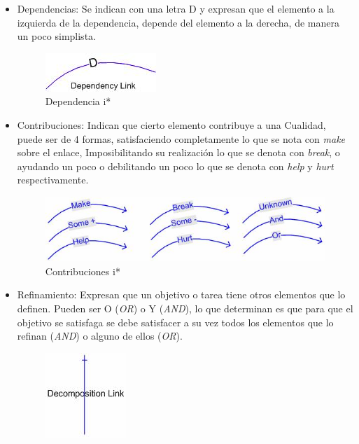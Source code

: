 \begin{itemize}
        \begin{itemize}
            \item Dependencias: Se indican con una letra D y expresan que el elemento a la izquierda de la dependencia, depende del elemento a la derecha, de manera un poco simplista.
            \begin{figure}[h!]
                \centering
                \includegraphics[scale=0.6]{media/imagenes/i_star/sintaxis/dependencylink.jpg}
                \caption{Dependencia \gls{i*}}
            \end{figure}
            \item Contribuciones: Indican que cierto elemento contribuye a una Cualidad, puede ser de 4 formas, satisfaciendo completamente lo que se nota con \textit{make} sobre el enlace, Imposibilitando su realización lo que se denota con \textit{break}, o ayudando un poco o debilitando un poco lo que se denota con \textit{help} y \textit{hurt} respectivamente.
            \begin{figure}[h!]
                \centering
                \includegraphics[scale=0.6]{media/imagenes/i_star/sintaxis/contribuitonlinks.jpg}
                \caption{Contribuciones \gls{i*}}
            \end{figure}
            \item Refinamiento: Expresan que un objetivo o tarea tiene otros elementos que lo definen. Pueden ser O (\textit{OR}) o Y (\textit{AND}), lo que determinan es que para que el objetivo se satisfaga se debe satisfacer a su vez todos los elementos que lo refinan (\textit{AND}) o alguno de ellos (\textit{OR}).
            \begin{figure}[h!]
                \centering
                \includegraphics[scale=0.6]{media/imagenes/i_star/sintaxis/decomposition.jpg}

\end{figure}
\end{itemize}
\end{itemize}
